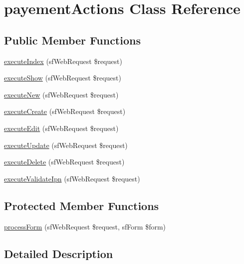 \hypertarget{classpayement_actions}{\section{payement\-Actions Class Reference}
\label{classpayement_actions}
}
\subsection*{Public Member Functions}
\begin{DoxyCompactItemize}
\item 
\hyperlink{classpayement_actions_a948cc911eb1d9f77990be54af3b2080f}{execute\-Index} (sf\-Web\-Request \$request)
\item 
\hyperlink{classpayement_actions_a0b1324a4d0a75d214ba8749adcbdd576}{execute\-Show} (sf\-Web\-Request \$request)
\item 
\hyperlink{classpayement_actions_a0ffbea56560c6c633dae68ec22aff21c}{execute\-New} (sf\-Web\-Request \$request)
\item 
\hyperlink{classpayement_actions_a75837617743fb64dca82d8133b2c662a}{execute\-Create} (sf\-Web\-Request \$request)
\item 
\hyperlink{classpayement_actions_af4d8fedd4b28f3398826a1bb8fa54394}{execute\-Edit} (sf\-Web\-Request \$request)
\item 
\hyperlink{classpayement_actions_af7b4f51862add3c2ebb54efc136a0840}{execute\-Update} (sf\-Web\-Request \$request)
\item 
\hyperlink{classpayement_actions_a52b5b11b11a0070dd2662257520c045a}{execute\-Delete} (sf\-Web\-Request \$request)
\item 
\hyperlink{classpayement_actions_a5c3d8311e640826658ab9c9ca446f8da}{execute\-Validate\-Ipn} (sf\-Web\-Request \$request)
\end{DoxyCompactItemize}
\subsection*{Protected Member Functions}
\begin{DoxyCompactItemize}
\item 
\hyperlink{classpayement_actions_a7cf661d837626e0320753cbffa019a01}{process\-Form} (sf\-Web\-Request \$request, sf\-Form \$form)
\end{DoxyCompactItemize}


\subsection{Detailed Description}


